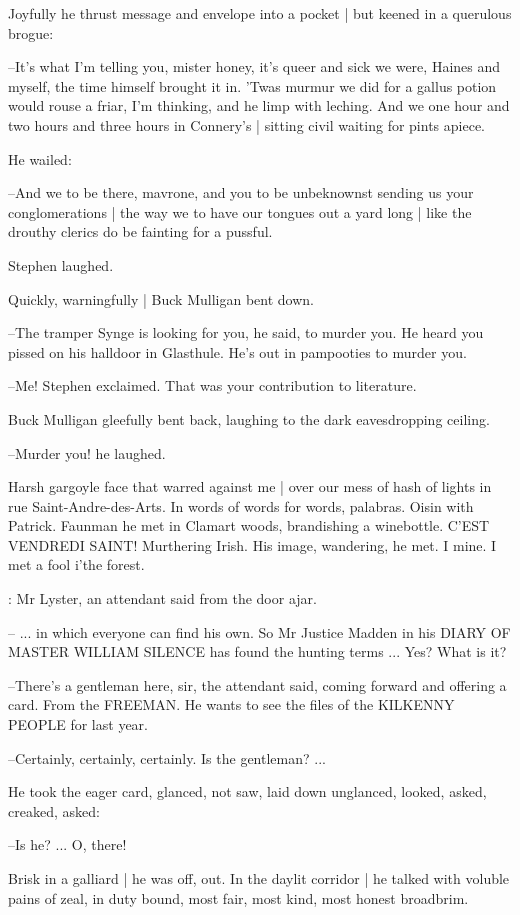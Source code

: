 Joyfully
he thrust message and envelope into a pocket |
but keened in a querulous brogue:

--It's what I'm telling you,
mister honey,
it's queer and sick we were,
Haines and myself,
the time himself brought it in.
'Twas murmur we did for a gallus potion would rouse a friar,
I'm thinking,
and he limp with leching.
And we one hour and two hours and three hours in Connery's |
sitting civil waiting for pints apiece.

He wailed:

--And we to be there,
mavrone,
and you to be unbeknownst sending us your conglomerations |
the way we to have our tongues out a yard long |
like the drouthy clerics do be fainting for a pussful.

Stephen laughed.

Quickly, warningfully |
Buck Mulligan bent down.

--The tramper Synge is looking for you,
he said,
to murder you.
He heard you pissed on his halldoor in Glasthule.
He's out in pampooties to murder you.

--Me!
Stephen exclaimed.
That was your contribution to literature.

Buck Mulligan gleefully bent back,
laughing to the dark eavesdropping ceiling.

--Murder you!
he laughed.

Harsh gargoyle face that warred against me |
over our mess of hash of lights in rue Saint-Andre-des-Arts.
In words of words for words,
palabras.
Oisin with Patrick.
Faunman he met in Clamart woods,
brandishing a winebottle.
C'EST VENDREDI SAINT!
Murthering Irish.
His image,
wandering,
he met.
I mine.
I met a fool i'the forest.

\attendant:
Mr Lyster,
an attendant said from the door ajar.

-- ... in which everyone can find his own.
So Mr Justice Madden in his DIARY OF MASTER WILLIAM SILENCE
has found the hunting terms ...
Yes?
What is it?

--There's a gentleman here,
sir,
the attendant said,
coming forward and offering a card.
From the FREEMAN.
He wants to see the files of the KILKENNY PEOPLE for last year.

--Certainly,
certainly,
certainly.
Is the gentleman? ...

He took the eager card,
glanced,
not saw,
laid down unglanced,
looked,
asked,
creaked,
asked:

--Is he?
...
O, there!

Brisk in a galliard |
he was off, out.
In the daylit corridor |
he talked with voluble pains of zeal,
in duty bound,
most fair,
most kind,
most honest broadbrim.

